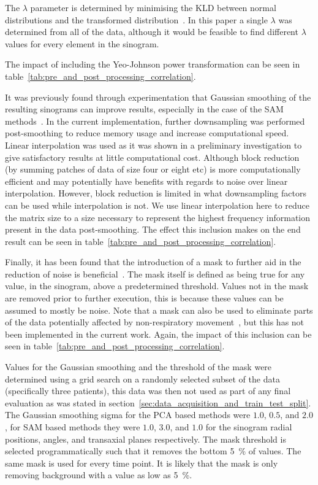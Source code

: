         The $\lambda$ parameter is determined by minimising the \gls{KLD} between normal distributions and the transformed distribution~\parencite{Yeo2000ASymmetry}. In this paper a single $\lambda$  was determined from all of the data, although it would be feasible to find different $\lambda$ values for every element in the sinogram.

        The impact of including the Yeo-Johnson power transformation can be seen in table~\ref{tab:pre_and_post_processing_correlation}.
        
        It was previously found through experimentation that Gaussian smoothing of the resulting sinograms can improve results, especially in the case of the \gls{SAM} methods~\parencite{Thielemans2013ComparisonData}. In the current implementation, further downsampling was performed post-smoothing to reduce memory usage and increase computational speed. Linear interpolation was used as it was shown in a preliminary investigation to give satisfactory results at little computational cost. Although block reduction (by summing patches of data of size four or eight etc) is more computationally efficient and may potentially have benefits with regards to noise over linear interpolation. However, block reduction is limited in what downsampling factors can be used while interpolation is not. We use linear interpolation here to reduce the matrix size to a size necessary to represent the highest frequency information present in the data post-smoothing. The effect this inclusion makes on the end result can be seen in table~\ref{tab:pre_and_post_processing_correlation}.
        
        Finally, it has been found that the introduction of a mask to further aid in the reduction of noise is beneficial~\parencite{Thielemans2011}. The mask itself is defined as being true for any value, in the sinogram, above a predetermined threshold. Values not in the mask are removed prior to further execution, this is because these values can be assumed to mostly be noise. Note that a mask can also be used to eliminate parts of the data potentially affected by non-respiratory movement~\parencite{Bertolli2018Data-DrivenTomography}, but this has not been implemented in the current work. Again, the impact of this inclusion can be seen in table~\ref{tab:pre_and_post_processing_correlation}.

        Values for the Gaussian smoothing and the threshold of the mask were determined using a grid search on a randomly selected subset of the data (specifically three patients), this data was then not used as part of any final evaluation as was stated in section~\ref{sec:data_acquisition_and_train_test_split}. The Gaussian smoothing sigma for the \gls{PCA} based methods were $1.0$, $0.5$, and $2.0$, for \gls{SAM} based methods they were $1.0$, $3.0$, and $1.0$ for the sinogram radial positions, angles, and transaxial planes respectively. The mask threshold is selected programmatically such that it removes the bottom \SI{5}{\percent} of values. The same mask is used for every time point. It is likely that the mask is only removing background with a value as low as \SI{5}{\percent}.

